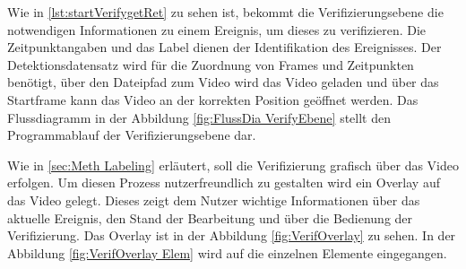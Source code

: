 Wie in \autoref{lst:startVerifygetRet} zu sehen ist, bekommt die Verifizierungsebene die notwendigen Informationen zu einem Ereignis, um dieses zu verifizieren. Die Zeitpunktangaben und das Label dienen der Identifikation des Ereignisses. Der Detektionsdatensatz wird für die Zuordnung von Frames und Zeitpunkten benötigt, über den Dateipfad zum Video wird das Video geladen und über das Startframe kann das Video an der korrekten Position geöffnet werden. Das Flussdiagramm in der Abbildung \ref{fig:FlussDia VerifyEbene} stellt den Programmablauf der Verifizierungsebene dar. 

Wie in \autoref{sec:Meth Labeling} erläutert, soll die Verifizierung grafisch über das Video erfolgen. Um diesen Prozess nutzerfreundlich zu gestalten wird ein Overlay auf das Video gelegt. Dieses zeigt dem Nutzer wichtige Informationen über das aktuelle Ereignis, den Stand der Bearbeitung und über die Bedienung der Verifizierung. Das Overlay ist in der Abbildung \ref{fig:VerifOverlay} zu sehen. In der Abbildung \ref{fig:VerifOverlay Elem} wird auf die einzelnen Elemente eingegangen.


